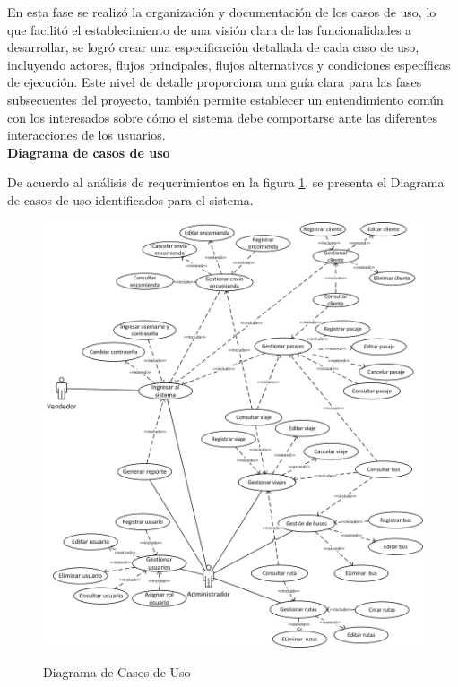 	En esta fase se realizó la organización y documentación de los casos de uso, lo que facilitó el establecimiento de una visión clara de las funcionalidades a desarrollar, se logró crear una especificación detallada de cada caso de uso, incluyendo actores, flujos principales, flujos alternativos y condiciones específicas de ejecución. Este nivel de detalle proporciona una guía clara para las fases subsecuentes del proyecto, también permite establecer un entendimiento común con los interesados sobre cómo el sistema debe comportarse ante las diferentes interacciones de los usuarios.\\
	\textbf{Diagrama de casos de uso}
		
	De acuerdo al análisis de requerimientos en la figura \ref{fig:caso_uso}, se presenta el Diagrama de casos de uso identificados para el sistema.
	
	\begin{figure}[!h] %
		\caption[Diagrama de Casos de Uso]
		{\newline Diagrama de Casos de Uso} %
		\vspace{0.3cm}
		\centering
		\includegraphics[width=1\textwidth]{imagenes/cap_3/casos_de_uso.png} %
		\vspace{0.3cm}
		\vspace{-0.8cm}
		\label{fig:caso_uso} %
	\end{figure}
	
